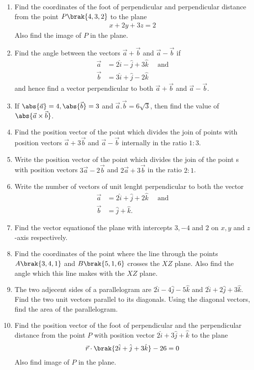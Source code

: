 \begin{enumerate}
    \item Find the coordinates of the foot of perpendicular and perpendicular distance from the point $P\brak{4, 3, 2}$ to the plane
          \begin{align*}
              x+2y+3z=2
          \end{align*}
          Also find the image of $P$ in the plane.
    \item Find the angle between the vectors $\vec{a} + \vec{b}$ and $\vec{a}-\vec{b}$ if
          \begin{align*}
              \vec{a} & =2\hat{i}-\hat{j}+3\hat{k} \quad \text{ and} \\
              \vec{b} & = 3\hat{i} + \hat{j} -2\hat{k}
          \end{align*}
          and hence find a vector perpendicular to both $\vec{a}+\vec{b}$ and $\vec{a}-\vec{b}$.
    \item If  $\abs{\vec{a}} = 4 , \abs{\vec{b}}=3$  and $\vec{a}.\vec{b}=6\sqrt{3}$, then find the value of $\abs{\vec{a}\times \vec{b}}$.
    \item Find the position vector of the point which divides the join of points with position vectors $\vec{a}+3\vec{b}$ and $\vec{a}-\vec{b}$ internally in the ratio $1:3$.
    \item Write the position vector of the point which divides the join of the point s with position vectors $3\vec{a} - 2\vec{b}$ and $2\vec{a} + 3\vec{b}$ in the ratio $2:1$.
    \item Write the number of vectors of unit lenght perpendicular to both the vector
          \begin{align*}
              \vec{a} & = 2 \hat{i} + \hat{j} +2\hat{k} \quad\text{ and} \\
              \vec{b} & = \hat{j}+\hat{k}.
          \end{align*}
    \item Find the vector equationof the plane with intercepts $3,-4$ and $2$ on $x,y$ and  $z$-axis respectively.
    \item Find the coordinates of the point where the line through the points $A\brak{3,4,1}$ and $B\brak{5,1,6}$ crosses the $XZ$ plane. Also find the angle which this line makes with the $XZ$ plane.
    \item The two adjecent sides of a parallelogram are $2\hat{i}-4\hat{j}-5\hat{k}$ and $2\hat{i}+2\hat{j}+3\hat{k}$. Find the two unit vectors parallel to its diagonals. Using the diagonal vectors, find the area of the parallelogram.
    \item Find the position vector of the foot of perpendicular and the perpendicular distance from the point $P$ with position vector $2\hat{i}+3\hat{j}+\hat{k}$ to the plane
          \begin{align*}
              \vec{r}\cdot\brak{2\hat{i}+\hat{j}+3\hat{k}} - 26=0
          \end{align*}
          Also find image of $P$ in the plane.
\end{enumerate}